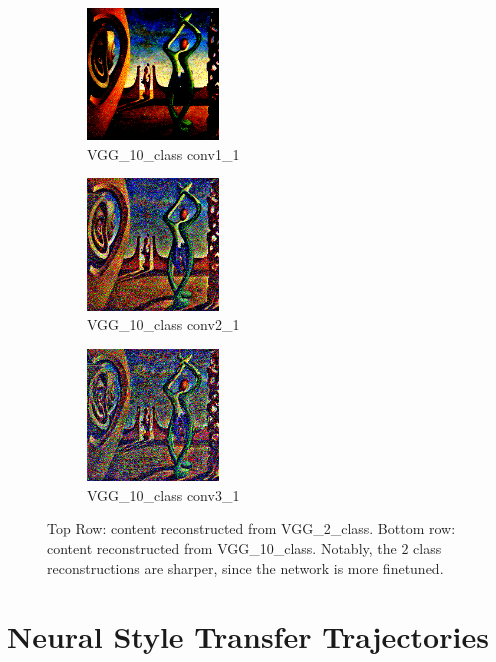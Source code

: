 \documentclass[twocolumn]{article}
\begin{document}
\begin{figure}[H]
  \begin{subfigure}[b]{0.3\textwidth}
  \centering
    \includegraphics[width=3.5cm]{images/reconstructed_layer_0.png}
    \caption{VGG\_10\_class conv1\_1}
    \label{fig:image4}
  \end{subfigure}
  \hfill
  \begin{subfigure}[b]{0.3\textwidth}
  \centering
    \includegraphics[width=3.5cm]{images/reconstructed_layer_5.png}
    \caption{VGG\_10\_class conv2\_1}
    \label{fig:image5}
  \end{subfigure}
  \hfill
  \begin{subfigure}[b]{0.3\textwidth}
  \centering
    \includegraphics[width=3.5cm]{images/reconstructed_layer_10.png}
    \caption{VGG\_10\_class conv3\_1}
    \label{fig:image6}
  \end{subfigure}

  \caption{Top Row: content reconstructed from VGG\_2\_class. Bottom row: content reconstructed from VGG\_10\_class. Notably, the $2$ class reconstructions are sharper, since the network is more finetuned.}
  \label{fig:4.2_content_reconstruction}
\end{figure}

\section{Neural Style Transfer Trajectories}\label{sec:trajectories}
\end{document}
